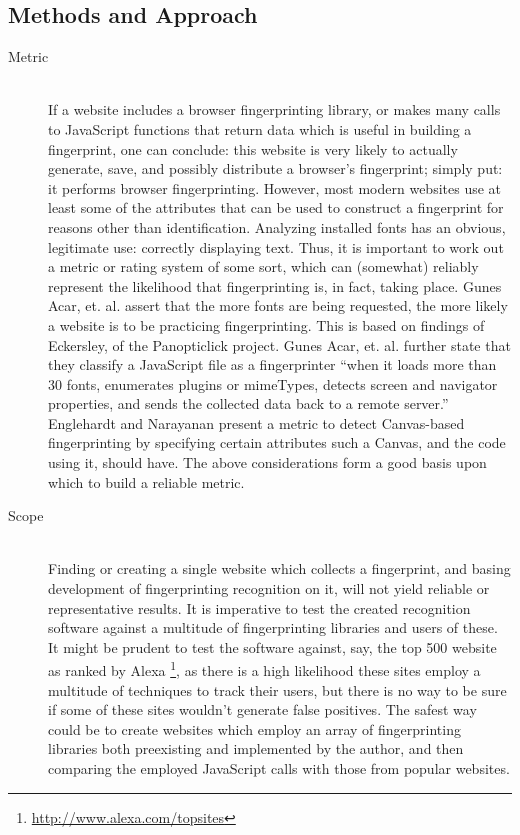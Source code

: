 \documentclass[a4paper, 12pt]{scrreprt}
\begin{document}
    \subsection{Methods and Approach}
    \begin{description}
        \item[Metric] \hfill \\
            If a website includes a browser fingerprinting library, or makes many calls to JavaScript functions that return
            data which is useful in building a fingerprint, one can conclude: this website is very likely to actually
            generate, save, and possibly distribute a browser's fingerprint; simply put: it performs browser fingerprinting.
            However, most modern websites use at least some of the attributes that can be used to construct a fingerprint
            for reasons other than identification. Analyzing installed fonts has an obvious, legitimate use: correctly displaying
            text. Thus, it is important to work out a metric or rating system of some sort, which can
            (somewhat) reliably represent the likelihood that fingerprinting is, in fact, taking place.
            Gunes Acar, et. al. assert that the more fonts are being requested, the more likely a website is to
            be practicing fingerprinting.\cite{acar2013fpdetective}
            This is based on findings of Eckersley, of the Panopticlick project.\cite{eckersley2010unique}
            Gunes Acar, et. al. further state that they classify a JavaScript file as a fingerprinter ``when it loads
            more than 30 fonts, enumerates plugins or mimeTypes, detects screen and navigator properties, and sends the
            collected data back to a remote server.''\cite{acar2013fpdetective}
            Englehardt and Narayanan present a metric to detect Canvas-based fingerprinting by specifying certain
            attributes such a Canvas, and the code using it, should have.\cite{englehardt2016census}
            The above considerations form a good basis upon which to build a reliable metric.

        \item[Scope] \hfill \\
            Finding or creating a single website which collects a fingerprint, and basing development of fingerprinting
            recognition on it, will not yield reliable or representative results. It is imperative to test
            the created recognition software against a multitude of fingerprinting libraries and users of these.
            It might be prudent to test the software against, say, the top 500 website as ranked by
            Alexa \footnote{\url{http://www.alexa.com/topsites}}, as there is a high likelihood these sites employ
            a multitude of techniques to track their users, but there is no way to be sure if some of these sites wouldn't
            generate false positives.
            The safest way could be to create websites which employ an array of fingerprinting libraries both preexisting and
            implemented by the author, and then comparing the employed JavaScript calls with those from popular websites.


\end{description}
\end{document}
